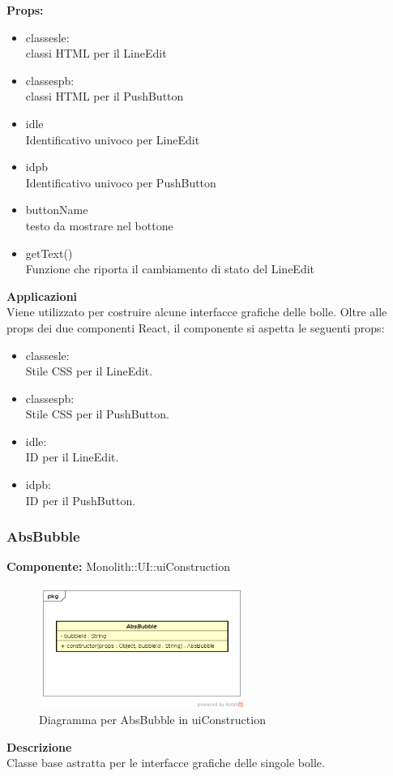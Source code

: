 \textbf{Props:} 
\begin{itemize}
\item classesle: 
\\
classi HTML per il LineEdit
\item classespb: 
\\
classi HTML per il PushButton
\item idle
\\
Identificativo univoco per LineEdit
\item idpb
\\
Identificativo univoco per PushButton
\item buttonName
\\
testo da mostrare nel bottone
\item getText()
\\
Funzione che riporta il cambiamento di stato del LineEdit

\end{itemize} 


\textbf{Applicazioni}\\
Viene utilizzato per costruire alcune interfacce grafiche delle bolle.
Oltre alle props dei due componenti React, il componente si aspetta le seguenti props:
\begin{itemize}

\item classesle:
\\
Stile CSS per il LineEdit.
\item classespb:
\\ 
Stile CSS per il PushButton.

\item idle:
\\
ID per il LineEdit.
\item idpb: 
\\
ID per il PushButton.
\end{itemize} 


\clearpage

\subsubsection{AbsBubble}
\textbf{Componente:}  Monolith::UI::uiConstruction\\
   \FloatBarrier
   \begin{figure}[ht]
   \centering
   \includegraphics[width=0.6\textwidth]{img/single-AbsBubble.png}
   \caption{{Diagramma per AbsBubble in uiConstruction}}
\end{figure}
\FloatBarrier
\textbf{Descrizione}\\
Classe base astratta per le interfacce grafiche delle singole bolle. 


